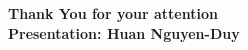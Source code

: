 \documentclass[
	11pt, %
]{beamer}
\begin{document}









\begin{frame}[plain] %
	\begin{center}
		{\Huge \textbf{Thank You for your attention}} \\
		\vspace{30px}
		{\textbf{Presentation: Huan Nguyen-Duy}}
            
	\end{center}
\end{frame}

\end{document}
